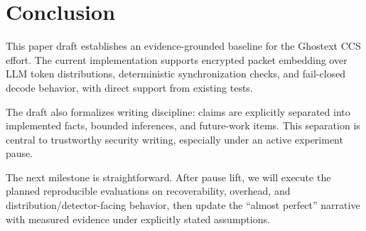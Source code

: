 \section{Conclusion}

This paper draft establishes an evidence-grounded baseline for the Ghostext CCS effort. The current implementation supports encrypted packet embedding over LLM token distributions, deterministic synchronization checks, and fail-closed decode behavior, with direct support from existing tests.

The draft also formalizes writing discipline: claims are explicitly separated into implemented facts, bounded inferences, and future-work items. This separation is central to trustworthy security writing, especially under an active experiment pause.

The next milestone is straightforward. After pause lift, we will execute the planned reproducible evaluations on recoverability, overhead, and distribution/detector-facing behavior, then update the ``almost perfect'' narrative with measured evidence under explicitly stated assumptions.
